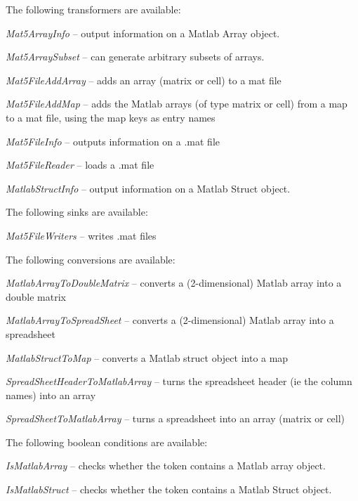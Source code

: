\documentclass[a4paper]{book}
\begin{document}
The following transformers are available:
\begin{tight_itemize}
  \item \textit{Mat5ArrayInfo} -- output information on a Matlab Array object.
  \item \textit{Mat5ArraySubset} -- can generate arbitrary subsets of arrays.
  \item \textit{Mat5FileAddArray} -- adds an array (matrix or cell) to a mat file
  \item \textit{Mat5FileAddMap} -- adds the Matlab arrays (of type matrix or cell) from a map to a mat file, using the map keys as entry names
  \item \textit{Mat5FileInfo} -- outputs information on a .mat file
  \item \textit{Mat5FileReader} -- loads a .mat file
  \item \textit{MatlabStructInfo} -- output information on a Matlab Struct object.
\end{tight_itemize}

The following sinks are available:
\begin{tight_itemize}
  \item \textit{Mat5FileWriters} -- writes .mat files
\end{tight_itemize}

The following conversions are available:
\begin{tight_itemize}
  \item \textit{MatlabArrayToDoubleMatrix} -- converts a (2-dimensional) Matlab array into a double matrix
  \item \textit{MatlabArrayToSpreadSheet} -- converts a (2-dimensional) Matlab array into a spreadsheet
  \item \textit{MatlabStructToMap} -- converts a Matlab struct object into a map
  \item \textit{SpreadSheetHeaderToMatlabArray} -- turns the spreadsheet header (ie the column names) into an array
  \item \textit{SpreadSheetToMatlabArray} -- turns a spreadsheet into an array (matrix or cell)
\end{tight_itemize}

The following boolean conditions are available:
\begin{tight_itemize}
  \item \textit{IsMatlabArray} -- checks whether the token contains a Matlab array object.
  \item \textit{IsMatlabStruct} -- checks whether the token contains a Matlab Struct object.
\end{tight_itemize}



\end{document}

